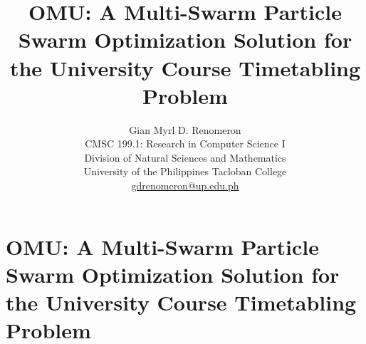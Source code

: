 \documentclass{article}
\begin{document}
\title{\textbf{OMU: A Multi-Swarm Particle Swarm Optimization Solution for the University Course Timetabling Problem}}
\author{Gian Myrl D. Renomeron\\
    CMSC 199.1: Research in Computer Science I\\
    Division of Natural Sciences and Mathematics\\
    University of the Philippines Tacloban College\\
    {\small \href{mailto:gdrenomeron@up.edu.ph}{gdrenomeron@up.edu.ph}}
}
\date{}

\maketitle
\pagebreak
    \section*{OMU: A Multi-Swarm Particle Swarm Optimization Solution for the University Course Timetabling Problem}












\printbibliography 
\end{document}
